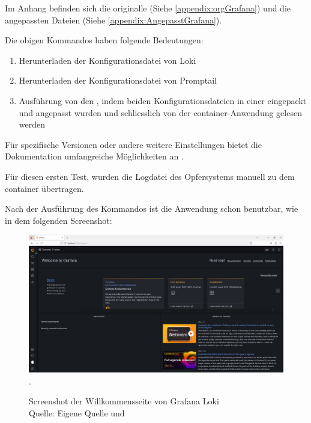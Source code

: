 Im Anhang befinden sich die originalle (Siehe \ref{appendix:orgGrafana}) und die angepassten Dateien (Siehe \ref{appendix:AngepasstGrafana}).

Die obigen Kommandos haben folgende Bedeutungen:
\begin{enumerate}[noitemsep]
   \item Herunterladen der Konfigurationsdatei von Loki
   \item Herunterladen der Konfigurationsdatei von Promptail
   \item Ausführung von den , indem beiden Konfigurationsdateien in einer eingepackt und angepasst wurden und schliesslich von der \gls{container}-Anwendung gelesen werden
\end{enumerate}

Für spezifische Versionen oder andere weitere Einstellungen bietet die Dokumentation umfangreiche Möglichkeiten an \citep{GrafanaLoki_run}.

Für diesen ersten Test, wurden die Logdatei des Opfersystems manuell zu dem \gls{container} übertragen.

\newpage
\thispagestyle{lscape}
\begin{landscape}
   Nach der Ausführung des Kommandos ist die Anwendung schon benutzbar, wie in dem folgenden Screenshot:
   \begin{center}
      \begin{figure}[H]
         \centering
         \includegraphics[width=1.3\textwidth]{assets/Installation_Grafana.png}.
         \caption{Screenshot der Willkommensseite von Grafana Loki\\Quelle: Eigene Quelle und \citep{Grafana_Logs}}
         \centering
      \end{figure}
   \end{center}
\end{landscape}

